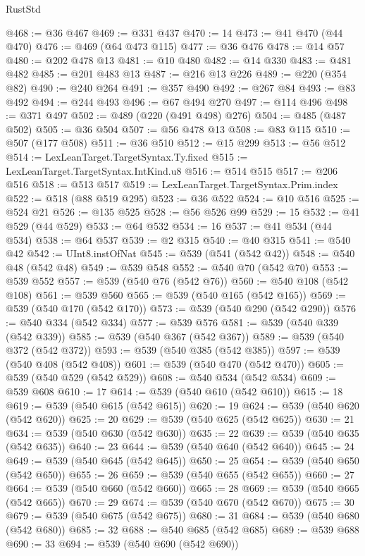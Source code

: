 \begin{lexlean}{RustStd}
\begin{coremodule}
{\begin{coremodule}
{{{{{{{{{{{{{{{{{{{{{{{{{{@468 := @36 @467
@469 := @331 @437
@470 := 14
@473 := @41 @470 (@44 @470)
@476 := @469 (@64 @473 @115)
@477 := @36 @476
@478 := @14 @57
@480 := @202 @478 @13
@481 := @10 @480
@482 := @14 @330
@483 := @481 @482
@485 := @201 @483 @13
@487 := @216 @13 @226
@489 := @220 (@354 @82)
@490 := @240 @264
@491 := @357 @490
@492 := @267 @84
@493 := @83 @492
@494 := @244 @493
@496 := @67 @494 @270
@497 := @114 @496
@498 := @371 @497
@502 := @489 (@220 (@491 @498) @276)
@504 := @485 (@487 @502)
@505 := @36 @504
@507 := @56 @478 @13
@508 := @83 @115
@510 := @507 (@177 @508)
@511 := @36 @510
@512 := @15 @299
@513 := @56 @512
@514 := LexLeanTarget.TargetSyntax.Ty.fixed
@515 := LexLeanTarget.TargetSyntax.IntKind.u8
@516 := @514 @515
@517 := @206 @516
@518 := @513 @517
@519 := LexLeanTarget.TargetSyntax.Prim.index
@522 := @518 (@88 @519 @295)
@523 := @36 @522
@524 := @10 @516
@525 := @524 @21
@526 := @135 @525
@528 := @56 @526 @99
@529 := 15
@532 := @41 @529 (@44 @529)
@533 := @64 @532
@534 := 16
@537 := @41 @534 (@44 @534)
@538 := @64 @537
@539 := @2 @315
@540 := @40 @315
@541 := @540 @42
@542 := UInt8.instOfNat
@545 := @539 (@541 (@542 @42))
@548 := @540 @48 (@542 @48)
@549 := @539 @548
@552 := @540 @70 (@542 @70)
@553 := @539 @552
@557 := @539 (@540 @76 (@542 @76))
@560 := @540 @108 (@542 @108)
@561 := @539 @560
@565 := @539 (@540 @165 (@542 @165))
@569 := @539 (@540 @170 (@542 @170))
@573 := @539 (@540 @290 (@542 @290))
@576 := @540 @334 (@542 @334)
@577 := @539 @576
@581 := @539 (@540 @339 (@542 @339))
@585 := @539 (@540 @367 (@542 @367))
@589 := @539 (@540 @372 (@542 @372))
@593 := @539 (@540 @385 (@542 @385))
@597 := @539 (@540 @408 (@542 @408))
@601 := @539 (@540 @470 (@542 @470))
@605 := @539 (@540 @529 (@542 @529))
@608 := @540 @534 (@542 @534)
@609 := @539 @608
@610 := 17
@614 := @539 (@540 @610 (@542 @610))
@615 := 18
@619 := @539 (@540 @615 (@542 @615))
@620 := 19
@624 := @539 (@540 @620 (@542 @620))
@625 := 20
@629 := @539 (@540 @625 (@542 @625))
@630 := 21
@634 := @539 (@540 @630 (@542 @630))
@635 := 22
@639 := @539 (@540 @635 (@542 @635))
@640 := 23
@644 := @539 (@540 @640 (@542 @640))
@645 := 24
@649 := @539 (@540 @645 (@542 @645))
@650 := 25
@654 := @539 (@540 @650 (@542 @650))
@655 := 26
@659 := @539 (@540 @655 (@542 @655))
@660 := 27
@664 := @539 (@540 @660 (@542 @660))
@665 := 28
@669 := @539 (@540 @665 (@542 @665))
@670 := 29
@674 := @539 (@540 @670 (@542 @670))
@675 := 30
@679 := @539 (@540 @675 (@542 @675))
@680 := 31
@684 := @539 (@540 @680 (@542 @680))
@685 := 32
@688 := @540 @685 (@542 @685)
@689 := @539 @688
@690 := 33
@694 := @539 (@540 @690 (@542 @690))
}}}}}}}}}}}}}}}}}}}}}}}}}}
\end{coremodule}}
\end{coremodule}
\end{lexlean}
